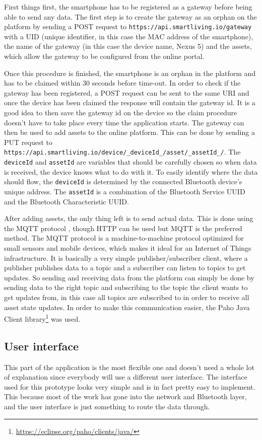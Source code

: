\documentclass[pdftex,a4paper,12pt,twoside]{report}
\begin{document}
First things first, the smartphone has to be registered as a gateway before being able to send any data. The first step is to create the gateway as an orphan on the platform by sending a POST request to \texttt{https://api.smartliving.io/gateway} with a UID (unique identifier, in this case the MAC address of the smartphone), the name of the gateway (in this case the device name, Nexus 5) and the assets, which allow the gateway to be configured from the online portal.

Once this procedure is finished, the smartphone is an orphan in the platform and has to be claimed within 30 seconds before time-out. In order to check if the gateway has been registered, a POST request can be sent to the same URI and once the device has been claimed the response will contain the gateway id. It is a good idea to then save the gateway id on the device so the claim procedure doesn't have to take place every time the application starts. The gateway can then be used to add assets to the online platform. This can be done by sending a PUT request to \texttt{https://api.smartliving.io/device/\_deviceId\_/asset/\_assetId\_/}. The \texttt{deviceId} and \texttt{assetId} are variables that should be carefully chosen so when data is received, the device knows what to do with it. To easily identify where the data should flow, the \texttt{deviceId} is determined by the connected Bluetooth device's unique address. The \texttt{assetId} is a combination of the Bluetooth Service UUID and the Bluetooth Characteristic UUID.

After adding assets, the only thing left is to send actual data. This is done using the MQTT protocol \citep{waher2015learning}, though HTTP can be used but MQTT is the preferred method. The MQTT protocol is a machine-to-machine protocol optimized for small sensors and mobile devices, which makes it ideal for an Internet of Things infrastructure. It is basically a very simple publisher/subscriber client, where a publisher publishes data to a topic and a subscriber can listen to topics to get updates. So sending and receiving data from the platform can simply be done by sending data to the right topic and subscribing to the topic the client wants to get updates from, in this case all topics are subscribed to in order to receive all asset state updates. In order to make this communication easier, the Paho Java Client library\footnote{\url{https://eclipse.org/paho/clients/java/}} was used.

\subsection{User interface}
\label{subsec:userinterface}
This part of the application is the most flexible one and doesn't need a whole lot of explanation since everybody will use a different user interface. The interface used for this prototype looks very simple and is in fact pretty easy to implement. This because most of the work has gone into the network and Bluetooth layer, and the user interface is just something to route the data through.
\end{document}
